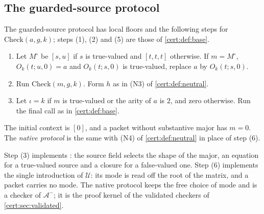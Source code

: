 \subsection{The guarded-source protocol}

\begin{definition}\label{cert:def:gs}
The guarded-source protocol has local floors and the following steps for
$\mathrm{Check}(a,g,k)$; steps (1), (2) and (5) are those of
\cref{cert:def:base}.
\begin{enumerate}
\item[(3)] Let $M^{\circ}$ be $[s,u]$ if $s$ is true-valued and $[t,t,t]$
otherwise. If $m=M^{\circ}$, $O_k(t;u,0)=a$ and $O_k(t;s,0)$ is true-valued,
replace $a$ by $O_k(t;s,0)$.
\item[(4)] Run $\mathrm{Check}(m,g,k)$. Form $h$ as in (N3) of
\cref{cert:def:neutral}.
\item[(6)] Let $\iota=k$ if $m$ is true-valued or the arity of $a$ is $2$,
and zero otherwise. Run the final call as in \cref{cert:def:base}.
\end{enumerate}
The initial context is $[0]$, and a packet without substantive major has
$m=0$. The \emph{native protocol} is the same with (N4) of
\cref{cert:def:neutral} in place of step (6).
\end{definition}

Step (3) implements : the source field selects the shape of the
major, an equation for a true-valued source and a closure for a false-valued
one. Step (6) implements the single introduction of $\mathcal U$: its mode is
read off the root of the matrix, and a packet carries no mode. The native
protocol keeps the free choice of mode and is a checker of $\mathcal A^{-}$;
it is the proof kernel of the validated checkers of \cref{cert:sec:validated}.


